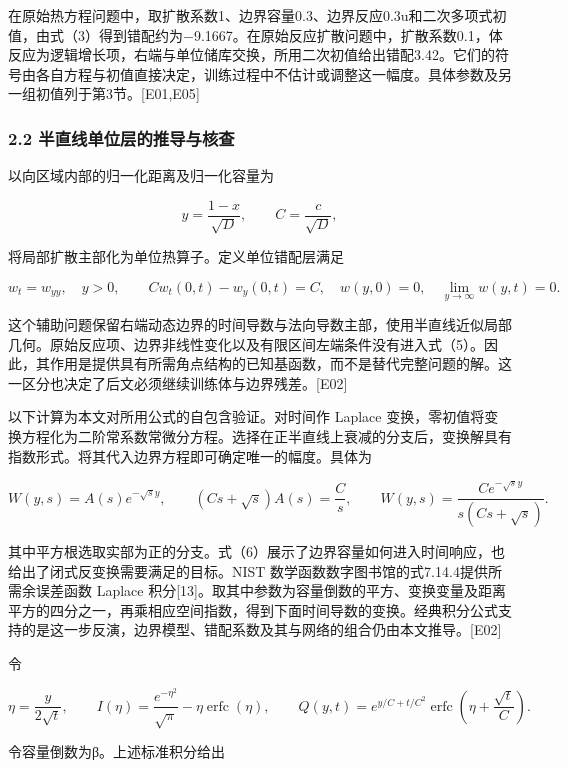 \documentclass[11pt,a4paper]{article}
\begin{document}
在原始热方程问题中，取扩散系数1、边界容量0.3、边界反应0.3u和二次多项式初值，由式（3）得到错配约为\ensuremath{-}9.1667。在原始反应扩散问题中，扩散系数0.1，体反应为逻辑增长项，右端与单位储库交换，所用二次初值给出错配3.42。它们的符号由各自方程与初值直接决定，训练过程中不估计或调整这一幅度。具体参数及另一组初值列于第3节。{[}E01,E05{]}

\subsubsection{2.2 半直线单位层的推导与核查}\label{ux534aux76f4ux7ebfux5355ux4f4dux5c42ux7684ux63a8ux5bfcux4e0eux6838ux67e5}

以向区域内部的归一化距离及归一化容量为

\[
y=\frac{1-x}{\sqrt D},\qquad C=\frac c{\sqrt D},
\tag{4}
\]

将局部扩散主部化为单位热算子。定义单位错配层满足

\[
w_t=w_{yy},\quad y>0,\qquad Cw_t(0,t)-w_y(0,t)=C,
\quad w(y,0)=0,\quad\lim_{y\to\infty}w(y,t)=0.
\tag{5}
\]

这个辅助问题保留右端动态边界的时间导数与法向导数主部，使用半直线近似局部几何。原始反应项、边界非线性变化以及有限区间左端条件没有进入式（5）。因此，其作用是提供具有所需角点结构的已知基函数，而不是替代完整问题的解。这一区分也决定了后文必须继续训练体与边界残差。{[}E02{]}

以下计算为本文对所用公式的自包含验证。对时间作 Laplace 变换，零初值将变换方程化为二阶常系数常微分方程。选择在正半直线上衰减的分支后，变换解具有指数形式。将其代入边界方程即可确定唯一的幅度。具体为

\[
W(y,s)=A(s)e^{-\sqrt{s}y},\qquad
(Cs+\sqrt{s})A(s)=\frac Cs,
\qquad
W(y,s)=\frac{C e^{-\sqrt{s}y}}{s(Cs+\sqrt{s})}.
\tag{6}
\]

其中平方根选取实部为正的分支。式（6）展示了边界容量如何进入时间响应，也给出了闭式反变换需要满足的目标。NIST 数学函数数字图书馆的式7.14.4提供所需余误差函数 Laplace 积分{[}13{]}。取其中参数为容量倒数的平方、变换变量及距离平方的四分之一，再乘相应空间指数，得到下面时间导数的变换。经典积分公式支持的是这一步反演，边界模型、错配系数及其与网络的组合仍由本文推导。{[}E02{]}

令

\[
\eta=\frac{y}{2\sqrt t},\qquad
I(\eta)=\frac{e^{-\eta^2}}{\sqrt\pi}-\eta\operatorname{erfc}(\eta),
\qquad Q(y,t)=e^{y/C+t/C^2}\operatorname{erfc}\!\left(\eta+\frac{\sqrt t}{C}\right).
\tag{7}
\]

令容量倒数为β。上述标准积分给出
\end{document}
